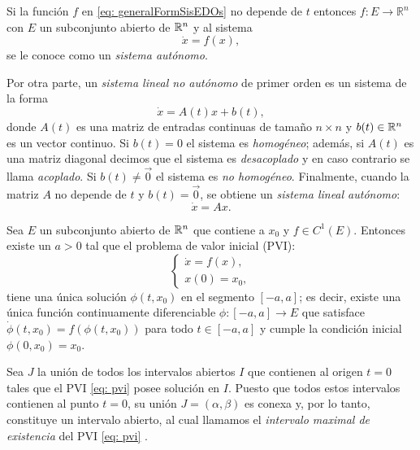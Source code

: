 Si la función $f$ en \eqref{eq: generalFormSisEDOs} no depende de $t$ entonces $f: E \longrightarrow \mathbb{R}^n$ con $E$ un subconjunto abierto de ${\mathbb{R}}^{n}$ y al sistema 
\begin{equation}
	\dot{x} = f(x),
	\label{eq: sisAut}
\end{equation} 
se le conoce como un \textit{sistema autónomo}.

Por otra parte, un \textit{sistema lineal no autónomo} de primer orden es un sistema de la forma
\begin{equation*}
	\dot{x} = A(t)x + b(t),
\end{equation*}
donde $A(t)$ es una matriz de entradas continuas de tamaño $n \times n$ y $b(t) \in {\mathbb{R}}^{n}$ es un vector continuo. Si $b(t) = 0$ el sistema es \textit{homogéneo}; además, si $A(t)$ es una matriz diagonal decimos que el sistema es \textit{desacoplado} y en caso contrario se llama \textit{acoplado}. Si $b(t) \neq \vec{0}$ el sistema es \textit{no homogéneo}. Finalmente, cuando la matriz $A$ no depende de $t$ y $b(t) = \vec{0}$, se obtiene un \textit{sistema lineal autónomo}:
\begin{equation}
	\dot{x} = Ax.
	\label{eq: sisLinAuto}
\end{equation}

\begin{teo}\cite[p. 74]{perko2001}\label{teo: Existencia y unicidad}
	Sea $E$ un subconjunto abierto de ${\mathbb{R}}^{n}$ que contiene a $x_{0}$ y $f \in C^{1}(E)$. Entonces existe un $a>0$ tal que el problema de valor inicial (PVI):
	\begin{equation}
		\left\{
		\begin{aligned}
			\dot{x} = f(x), \\
			x(0) = x_{0},
		\end{aligned}
		\right.
		\label{eq: pvi}
	\end{equation}
    tiene una única solución $\phi(t, x_0)$ en el segmento $[-a,a]$; es decir, existe una única función continuamente diferenciable $\phi: [-a,a] \longrightarrow E$ que satisface $\dot{\phi}(t, x_0) = f(\phi(t, x_0))$ para todo $t \in [-a,a]$ y cumple la condición inicial $\phi(0, x_0) = x_0$.
\end{teo}

\noindent Sea $J$ la unión de todos los intervalos abiertos $I$ que contienen al origen $t = 0$ tales que el PVI \eqref{eq: pvi} posee solución en $I$. Puesto que todos estos intervalos contienen al punto $t = 0$, su unión $J = (\alpha, \beta)$ es conexa y, por lo tanto, constituye un intervalo abierto, al cual llamamos el \textit{intervalo maximal de existencia} del PVI \eqref{eq: pvi} \cite[pp.~89--90]{perko2001}.

